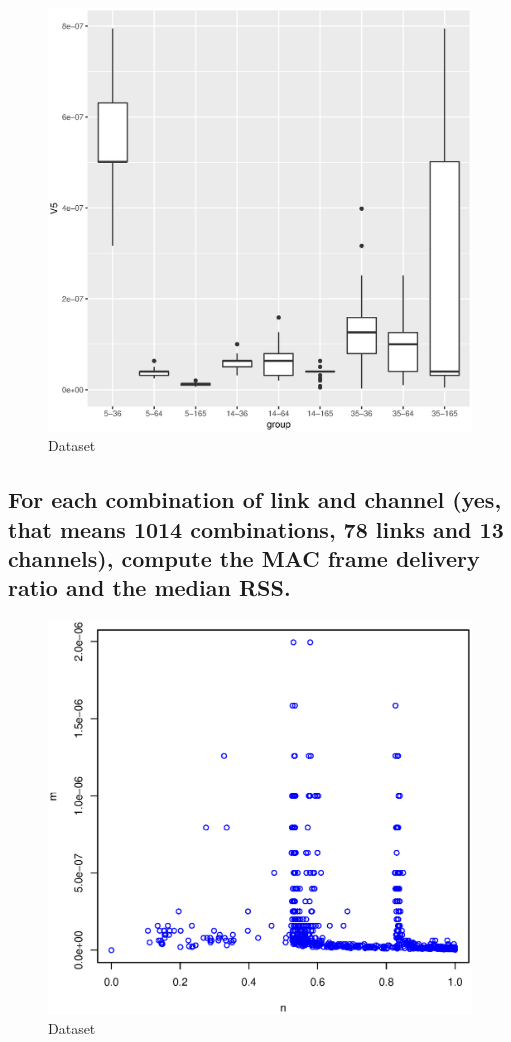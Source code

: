 \documentclass [12 pt , a4paper ] {article}
\begin{document}
\begin{figure}[!ht]
  \centering
  \includegraphics[scale=0.8]{boxplot.eps}
  \caption{Dataset}
  \label{fig:Dataset}
\end{figure}
\subsection{For each combination of link and channel (yes, that means
 1014 combinations, 78 links and 13
channels), compute the MAC frame delivery ratio and the median RSS.}
\begin{figure}[!ht]
  \centering
  \includegraphics[scale=0.8]{rssvsn.eps}
  \caption{Dataset}
  \label{fig:rssvsn}
\end{figure}
\end{document}
